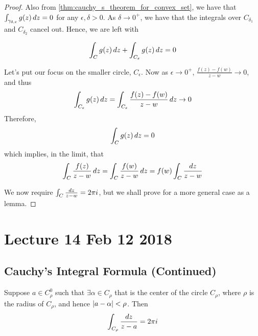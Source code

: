 \documentclass[11pt, oneside]{book}
\begin{document}
\begin{proof}
	Also from \cref{thm:cauchy_s_theorem_for_convex_set}, we have that $\int_{\gamma_{\delta, \varepsilon}} g(z) \mathop{}\!d{z} = 0$ for any $\epsilon, \delta > 0$. As $\delta \to 0^+$, we have that the integrals over $C_{\delta_1}$ and $C_{\delta_2}$ cancel out. Hence, we are left with

	\begin{equation*}
		\int_{C} g(z) \mathop{}\!d{z} + \int_{C_\varepsilon} g(z) \mathop{}\!d{z} = 0
	\end{equation*}

	Let's put our focus on the smaller circle, $C_\epsilon$. Now as $\epsilon \to 0^+$, $\frac{f(z) - f(w)}{z - w} \to 0$, and thus
	\begin{equation*}
		\int_{C_\varepsilon} g(z) \mathop{}\!d{z} = \int_{C_\varepsilon} \frac{f(z) - f(w)}{z - w} \mathop{}\!d{z} \to 0
	\end{equation*}
	Therefore,
	\begin{equation*}
		\int_{C} g(z) \mathop{}\!d{z} = 0
	\end{equation*}
	which implies, in the limit, that
	\begin{equation*}
		\int_{C} \frac{f(z)}{z - w} \mathop{}\!d{z}
			= \int_{C} \frac{f(w)}{z - w} \mathop{}\!d{z}
			= f(w) \int_{C} \frac{\mathop{}\!d{z}}{z - w}
	\end{equation*}
	
	We now require $\int_{C} \frac{\mathop{}\!d{z}}{z - w} = 2 \pi i$, but we shall prove for a more general case as a lemma.
\end{proof}



\chapter{Lecture 14 Feb 12 2018}
	\label{chapter:lecture_14_feb_12_2018}

\section{Cauchy's Integral Formula (Continued)} %
\label{sec:cauchy_s_integral_formula_continued}

\begin{lemma}\label{lemma:integral_equals_2_pi_i}

	Suppose $a \in C_\rho^0$ such that $\exists \alpha \in C_\rho$ that is the center of the circle $C_\rho$, where $\rho$ is the radius of $C_\rho$, and hence $\left|a - \alpha\right| < \rho$. Then
	\begin{equation*}
		\int_{C_\rho} \frac{\mathop{}\!d{z}}{z - a} = 2 \pi i
	\end{equation*}
\end{lemma}
\end{document}
